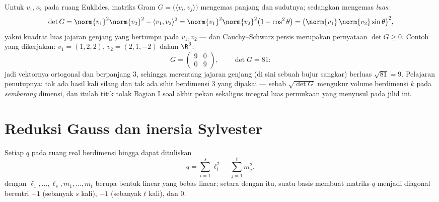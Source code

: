 \begin{example}\label{ex:b2:quadratic:gramarea}
Untuk $v_1, v_2$ pada ruang Euklides, matriks Gram $G =
\bigl(\langle v_i, v_j\rangle\bigr)$ mengemas panjang dan
sudutnya; sedangkan  mengemas \emph{luas}:
\[
\det G = \norm{v_1}^2\norm{v_2}^2 - \langle v_1, v_2\rangle^2
= \norm{v_1}^2\norm{v_2}^2\bigl(1 - \cos^2\theta\bigr)
= \bigl(\norm{v_1}\,\norm{v_2}\sin\theta\bigr)^2 ,
\]
yakni kuadrat luas jajaran genjang yang bertumpu pada $v_1, v_2$ ---
dan Cauchy--Schwarz persis merupakan pernyataan $\det G \geq 0$.
Contoh yang dikerjakan: $v_1 = (1, 2, 2)$, $v_2 = (2, 1, -2)$ dalam
$\R^3$:
\[
G = \begin{pmatrix} 9 & 0\\ 0 & 9 \end{pmatrix},
\qquad
\det G = 81 :
\]
jadi vektornya ortogonal dan berpanjang $3$, sehingga merentang
jajaran genjang (di sini sebuah bujur sangkar) berluas $\sqrt{81} = 9$.
Pelajaran penutupnya: tak ada hasil kali silang dan tak ada sihir
berdimensi $3$ yang dipakai --- sebab $\sqrt{\det G}$ mengukur volume
berdimensi $k$ pada \emph{sembarang} dimensi, dan itulah titik tolak
Bagian I soal akhir pekan sekaligus integral luas permukaan yang
menyusul pada jilid ini.
\end{example}

\section{Reduksi Gauss dan inersia Sylvester}

\begin{theorem}\label{thm:b2:quadratic:gauss}
Setiap  $q$ pada ruang real berdimensi hingga dapat
dituliskan
\[
q = \sum_{i=1}^{s} \ell_i^2 - \sum_{j=1}^{t} m_j^2 ,
\]
dengan $\ell_1, \dots, \ell_s, m_1, \dots, m_t$ berupa bentuk linear
yang bebas linear; setara dengan itu, suatu basis membuat
matriks $q$ menjadi diagonal berentri $+1$ (sebanyak $s$ kali), $-1$
(sebanyak $t$ kali), dan $0$.
\end{theorem}

